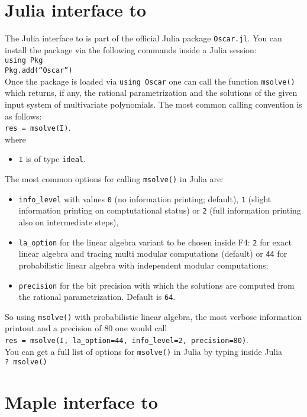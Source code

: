 \documentclass[a4paper,english,11pt]{scrartcl}
\theoremstyle{definition}
\theoremstyle{remark}
\begin{document}
\section{Julia interface to \msolve}
The Julia interface to \msolve is part of the official Julia package
\texttt{Oscar.jl}. You can install the package via the following
commands inside a Julia session:\\[1em]
\texttt{using Pkg\\
Pkg.add(“Oscar”)}\\[1em]
Once the package is loaded via \texttt{using Oscar} one can call the function
\texttt{msolve()} which returns, if any, the rational parametrization and the solutions of the given input
system of multivariate polynomials. The most common calling convention is as follows:\\[1em]
\texttt{res = msolve(I)}.\\[1em]
where
\begin{itemize}
    \item \texttt{I} is of type \texttt{ideal}.
\end{itemize}
The most common options for calling \texttt{msolve()} in Julia are:
\begin{itemize}
    \item \texttt{info\_level} with values \texttt{0} (no information printing;
        default), \texttt{1} (slight information printing on comptutational
        status) or \texttt{2} (full information printing also on intermediate
        steps),
    \item \texttt{la\_option} for the linear algebra variant to be chosen inside
        F4: \texttt{2} for exact linear algebra and tracing multi modular
        computations (default) or \texttt{44} for probabilistic linear algebra
        with independent modular computations;
    \item \texttt{precision} for the bit precision with which the solutions are
        computed from the rational parametrization. Default is \texttt{64}.
\end{itemize}
So using \texttt{msolve()} with probabilistic linear algebra, the most verbose
information printout and a precision of $80$ one would call\\[1em]
\texttt{res = msolve(I, la\_option=44, info\_level=2,
precision=80)}.\\[1em]
You can get a full list of options for \texttt{msolve()} in Julia by typing
inside Julia\\[1em]
\texttt{? msolve()}
\section{Maple interface to \msolve}
\end{document}
